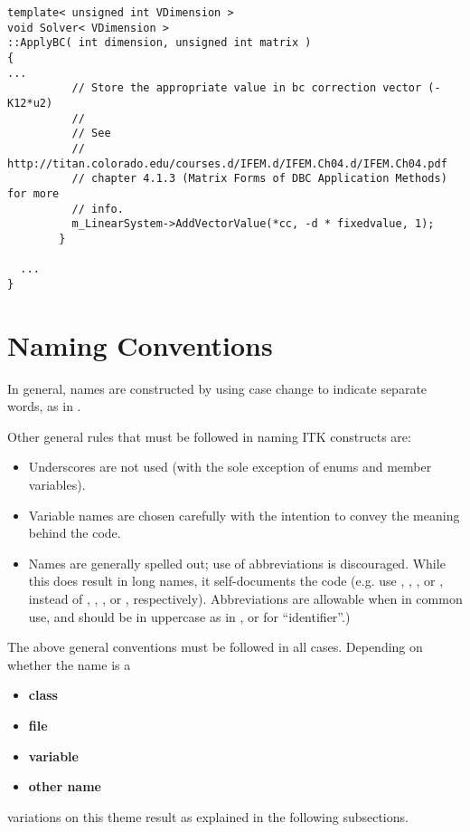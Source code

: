 \small
\begin{verbatim}
template< unsigned int VDimension >
void Solver< VDimension >
::ApplyBC( int dimension, unsigned int matrix )
{
...
          // Store the appropriate value in bc correction vector (-K12*u2)
          //
          // See
          // http://titan.colorado.edu/courses.d/IFEM.d/IFEM.Ch04.d/IFEM.Ch04.pdf
          // chapter 4.1.3 (Matrix Forms of DBC Application Methods) for more
          // info.
          m_LinearSystem->AddVectorValue(*cc, -d * fixedvalue, 1);
        }

  ...
}
\end{verbatim}
\normalsize


\section{Naming Conventions}
\label{sec:NamingConventions}

In general, names are constructed by using case change to indicate separate
words, as in .

Other general rules that must be followed in naming ITK constructs are:
\begin{itemize}
\item Underscores are not used (with the sole exception of enums and member
variables).
\item Variable names are chosen carefully with the intention to convey the
meaning behind the code.
\item Names are generally spelled out; use of abbreviations is discouraged.
While this does result in long names, it self-documents the code (e.g. use
, , , or , instead of
, , , or , respectively). Abbreviations
are allowable when in common use, and should be in uppercase as in ,
or  for ``identifier''.)
\end{itemize}


The above general conventions must be followed in all cases. Depending on
whether the name is a
\begin{itemize}
\item \textbf{class}
\item \textbf{file}
\item \textbf{variable}
\item \textbf{other name}
\end{itemize}
variations on this theme result as explained in the following subsections.


